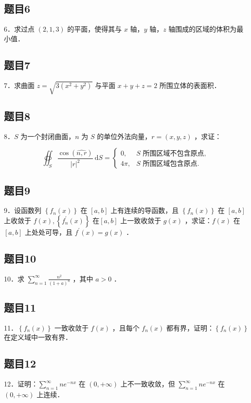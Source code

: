 \documentclass{article}
\begin{document}
\subsection{题目6}
6．求过点 \((2,1,3)\) 的平面，使得其与 \(x\) 轴，\(y\) 轴，\(z\) 轴围成的区域的体积为最小值．

\subsection{题目7}
7．求曲面 \(z=\sqrt{3\left(x^{2}+y^{2}\right)}\) 与平面 \(x+y+z=2\) 所围立体的表面积．

\subsection{题目8}
8．\(S\) 为一个封闭曲面，\(n\) 为 \(S\) 的单位外法向量，\(r=(x, y, z)\) ，求证：

\[
\oiint_{S} \frac{\cos (\widehat{n, r})}{|r|^{2}} \mathrm{~d} S= \begin{cases}0, & S \text { 所围区域不包含原点, } \\ 4 \pi, & S \text { 所围区域包含原点. }\end{cases}
\]

\subsection{题目9}
9．设函数列 \(\left\{f_{n}(x)\right\}\) 在 \([a, b]\) 上有连续的导函数，且 \(\left\{f_{n}(x)\right\}\) 在 \([a, b]\) 上收敛于 \(f(x),\left\{f_{n}^{\prime}(x)\right\}\) 在\([a, b]\) 上一致收敛于 \(g(x)\) ，求证：\(f(x)\) 在 \([a, b]\) 上处处可导，且 \(f^{\prime}(x)=g(x)\) ．

\subsection{题目10}
10．求 \(\sum_{n=1}^{\infty} \frac{n^{2}}{(1+a)^{n}}\) ，其中 \(a>0\) ．

\subsection{题目11}
11．\(\left\{f_{n}(x)\right\}\) 一致收敛于 \(f(x)\) ，且每个 \(f_{n}(x)\) 都有界，证明：\(\left\{f_{n}(x)\right\}\) 在定义域中一致有界．

\subsection{题目12}
12．证明：\(\sum_{n=1}^{\infty} n e^{-n x}\) 在 \((0,+\infty)\) 上不一致收敛，但 \(\sum_{n=1}^{\infty} n e^{-n x}\) 在 \((0,+\infty)\) 上连续．
\end{document}
